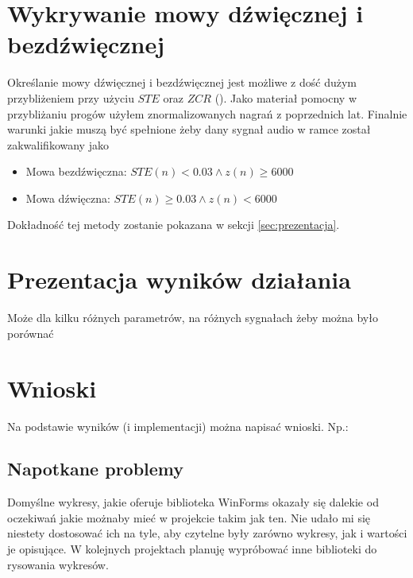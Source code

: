 \documentclass[12pt,a4paper]{article}
\begin{document}
\section{Wykrywanie mowy dźwięcznej i bezdźwięcznej\label{sec:mowa}}
Określanie mowy dźwięcznej i bezdźwięcznej jest możliwe z dość dużym przybliżeniem przy użyciu $STE$ oraz $ZCR$ (\citep{bachu08}). Jako materiał pomocny w przybliżaniu progów użyłem znormalizowanych nagrań z poprzednich lat. Finalnie warunki jakie muszą być spełnione żeby dany sygnał audio w ramce został zakwalifikowany jako
\begin{itemize}
    \item Mowa bezdźwięczna: $STE(n)<0.03 \land z(n) \ge 6000$
    \item Mowa dźwięczna: $STE(n)\ge0.03 \land z(n) < 6000$
\end{itemize}
Dokładność tej metody zostanie pokazana w sekcji \ref{sec:prezentacja}.

\section{Prezentacja wyników działania\label{sec:prezentacja}}
Może dla kilku różnych parametrów, na różnych sygnałach żeby można było porównać


\section{Wnioski\label{sec:wnioski}}
Na podstawie wyników (i implementacji) można napisać wnioski. Np.:

\subsection{Napotkane problemy\label{sec:problemy}}
Domyślne wykresy, jakie oferuje biblioteka WinForms okazały się dalekie od oczekiwań jakie możnaby mieć w projekcie takim jak ten. Nie udało mi się niestety dostosować ich na tyle, aby czytelne były zarówno wykresy, jak i wartości je opisujące. W kolejnych projektach planuję wypróbować inne biblioteki do rysowania wykresów.
\end{document}
